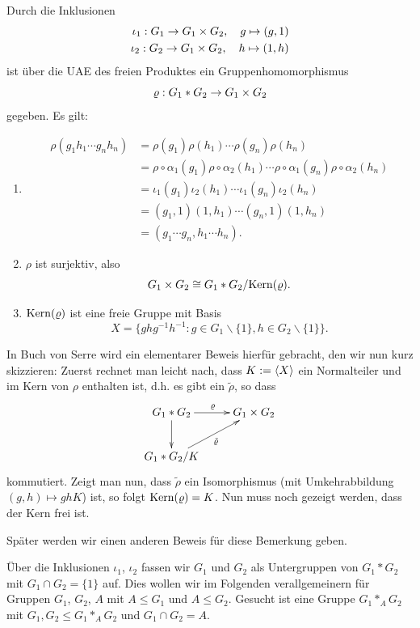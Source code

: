 \documentclass[a4paper, 12pt, twoside]{article}
\begin{document}
\BEM\label{bem_freiprodukt}
Durch die Inklusionen
\begin{align*}
\iota_1:G_1\rightarrow G_1\times G_2,\quad g\mapsto(g,1) \\
\iota_2:G_2\rightarrow G_1\times G_2,\quad h\mapsto(1,h)
\end{align*}
ist über die UAE des freien Produktes ein Gruppenhomomorphismus
\[
\varrho:G_1*G_2\rightarrow G_1\times G_2
\]
gegeben. Es gilt:
\begin{enumerate}
\item
\begin{align*}
\rho(g_1 h_1\cdots g_n h_n) &=
\rho(g_1)\rho(h_1)\cdots\rho(g_n)\rho(h_n) \\
&=\rho\circ\alpha_1(g_1)\rho\circ\alpha_2(h_1)\cdots\rho\circ\alpha_1(g_n)\rho\circ\alpha_2(h_n) \\
&=\iota_1(g_1)\iota_2(h_1)\cdots\iota_1(g_n)\iota_2(h_n) \\
&=(g_1,1)(1,h_1)\cdots(g_n,1)(1,h_n) \\
&=(g_1\cdots g_n,h_1\cdots h_n).
\end{align*}
\item $\rho$ ist surjektiv, also
\[
G_1\times G_2 \cong G_1*G_2/\mathrm{Kern}(\varrho).
\]
\item $\mathrm{Kern}(\varrho)$ ist eine freie Gruppe mit Basis
\[
X=\{ ghg^{-1}h^{-1}:g\in G_1\backslash\{1\},h\in G_2\backslash\{1\}\}.
\]
\end{enumerate}
In Buch von Serre \cite{serre} wird ein elementarer Beweis hierfür
gebracht, den wir nun kurz skizzieren:
Zuerst rechnet man leicht nach, dass $K:=\langle X\rangle$ ein Normalteiler
und im Kern von $\rho$ enthalten ist, d.h. es gibt ein $\tilde{\rho}$,
so dass
\[\xymatrix{
G_1*G_2 \ar[r]^{\rho}\ar[d] & G_1\times G_2 \\
G_1*G_2/K \ar[ur]_{\tilde{\rho}}
}\]
kommutiert. Zeigt man nun, dass $\tilde{\rho}$ ein Isomorphismus
(mit Umkehrabbildung $(g,h)\mapsto gh K$) ist, so folgt
$\mathrm{Kern}(\varrho)=K$. Nun muss noch gezeigt werden, dass der Kern frei ist.

Später werden wir einen anderen Beweis für diese Bemerkung geben.

Über die Inklusionen $\iota_1$, $\iota_2$ fassen wir $G_1$ und $G_2$
als Untergruppen von $G_1*G_2$ mit $G_1\cap G_2=\{1\}$ auf.
Dies wollen wir im Folgenden verallgemeinern für Gruppen $G_1$, $G_2$,
$A$ mit $A\leq G_1$ und $A\leq G_2$. Gesucht ist eine Gruppe
$G_1 *_A G_2$ mit $G_1, G_2 \leq G_1 *_A G_2$ und
$G_1 \cap G_2 = A$.
\end{document}
